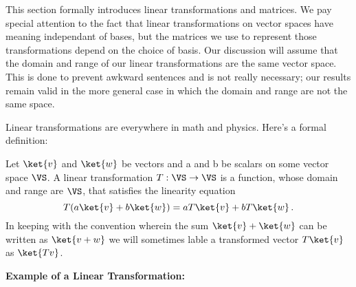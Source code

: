 
This section formally introduces linear transformations and matrices.
We pay special attention to the fact that linear transformations on vector spaces have meaning independant of bases, but the matrices we use to represent those transformations depend on the choice of basis.
Our discussion will assume that the domain and range of our linear transformations are the same vector space.
This is done to prevent awkward sentences and is not really necessary; our results remain valid in the more general case in which the domain and range are not the same space.

Linear transformations are everywhere in math and physics.
Here's a formal definition:

\begin{definition}
  Let $\ket{v}$ and $\ket{w}$ be vectors and a and b be scalars on some vector space $\VS$.
  A linear transformation $T:\VS \rightarrow \VS$ is a function, whose domain and range are $\VS$, that satisfies the linearity equation
  \begin{displaymath}
    T(a\ket{v} + b\ket{w}) = aT\ket{v} + bT\ket{w} \,.
  \end{displaymath}
  In keeping with the convention wherein the sum $\ket{v} + \ket{w}$ can be written as $\ket{v+w}$ we will sometimes lable a transformed vector $T\ket{v}$ as $\ket{Tv}$.
\end{definition}

\begin{flushleft}\textbf{Example of a Linear Transformation:}\end{flushleft}

